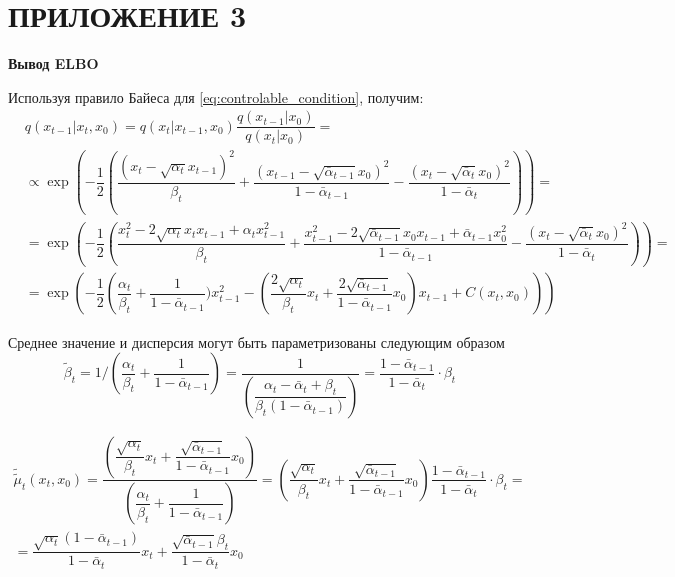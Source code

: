 \newpage
{}
{\NonNumberedSection\section*{ПРИЛОЖЕНИЕ 3}}
\pagestyle{supplement3}
\label{AppendixC}


\textbf{Вывод ELBO}

Используя правило Байеса для \ref{eq:controlable_condition}, получим:
\[
    \begin{aligned}
        &q(x_{t-1} | x_t, x_0) = q(x_t | x_{t-1}, x_0) \dfrac{ q(x_{t-1} | x_0) }{ q(x_t | x_0) } = \\
        &\propto \exp \left(-\dfrac{1}{2} \left(\dfrac{(x_t - \sqrt{\alpha_t} x_{t-1})^2}{\beta_t} + \dfrac{(x_{t-1} - \sqrt{\bar{\alpha}_{t-1}} x_0)^2}{1-\bar{\alpha}_{t-1}} - \dfrac{(x_t - \sqrt{\bar{\alpha}_t} x_0)^2}{1-\bar{\alpha}_t} \right) \right) = \\
        &= \exp \left(-\dfrac{1}{2} \left(\dfrac{x_t^2 - 2\sqrt{\alpha_t} x_t x_{t-1} + \alpha_t x_{t-1}^2 }{\beta_t} + \dfrac{ x_{t-1}^2 - 2 \sqrt{\bar{\alpha}_{t-1}} x_0 x_{t-1} + \bar{\alpha}_{t-1} x_0^2 }{1-\bar{\alpha}_{t-1}} - \dfrac{(x_t - \sqrt{\bar{\alpha}_t} x_0)^2}{1-\bar{\alpha}_t} \right) \right) = \\
        &= \exp\left( -\dfrac{1}{2} \left(\dfrac{\alpha_t}{\beta_t} + \dfrac{1}{1 - \bar{\alpha}_{t-1}}) x_{t-1}^2 - (\dfrac{2\sqrt{\alpha_t}}{\beta_t} x_t + \dfrac{2\sqrt{\bar{\alpha}_{t-1}}}{1 - \bar{\alpha}_{t-1}} x_0) x_{t-1} + C(x_t, x_0) \right) \right)
    \end{aligned}
\]

\par
Среднее значение и дисперсия могут быть параметризованы следующим образом
\[
    \tilde{\beta}_t = 1/\left(\dfrac{\alpha_t}{\beta_t} + \dfrac{1}{1 - \bar{\alpha}_{t-1}}\right) = \dfrac{1}{\left(\dfrac{\alpha_t - \bar{\alpha}_t + \beta_t}{\beta_t(1 - \bar{\alpha}_{t-1})}\right)} = \dfrac{1 - \bar{\alpha}_{t-1}}{1 - \bar{\alpha}_t} \cdot \beta_t
\]


\[
    \begin{aligned}
    \tilde{\tilde{\mu}}_t (x_t, x_0) = \dfrac{\left(\dfrac{\sqrt{\alpha_t}}{\beta_t} x_t + \dfrac{\sqrt{\bar{\alpha}_{t-1}}}{1 - \bar{\alpha}_{t-1}} x_0\right)}{\left(\dfrac{\alpha_t}{\beta_t} + \dfrac{1}{1 - \bar{\alpha}_{t-1}}\right)} = \left(\dfrac{\sqrt{\alpha_t}}{\beta_t} x_t + \dfrac{\sqrt{\bar{\alpha}_{t-1}}}{1 - \bar{\alpha}_{t-1}} x_0\right) \dfrac{1 - \bar{\alpha}_{t-1}}{1 - \bar{\alpha}_t} \cdot \beta_t  =\\[0.5cm]
    = \dfrac{\sqrt{\alpha_t}(1 - \bar{\alpha}_{t-1})}{1 - \bar{\alpha}_t} x_t + \dfrac{\sqrt{\bar{\alpha}_{t-1}}\beta_t}{1 - \bar{\alpha}_t} x_0
    \end{aligned}
\]

